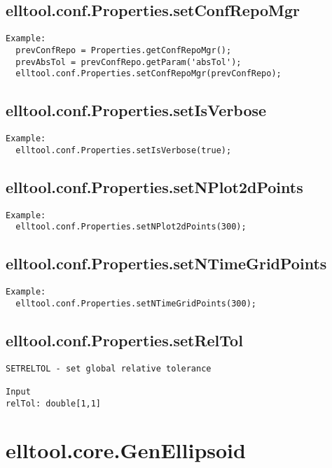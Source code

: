 \subsection{\texorpdfstring{elltool.conf.Properties.setConfRepoMgr}{setConfRepoMgr}}\label{method:elltool.conf.Properties.setConfRepoMgr}
\begin{verbatim}
Example:
  prevConfRepo = Properties.getConfRepoMgr();
  prevAbsTol = prevConfRepo.getParam('absTol');
  elltool.conf.Properties.setConfRepoMgr(prevConfRepo);
\end{verbatim}
\subsection{\texorpdfstring{elltool.conf.Properties.setIsVerbose}{setIsVerbose}}\label{method:elltool.conf.Properties.setIsVerbose}
\begin{verbatim}
Example:
  elltool.conf.Properties.setIsVerbose(true);
\end{verbatim}
\subsection{\texorpdfstring{elltool.conf.Properties.setNPlot2dPoints}{setNPlot2dPoints}}\label{method:elltool.conf.Properties.setNPlot2dPoints}
\begin{verbatim}
Example:
  elltool.conf.Properties.setNPlot2dPoints(300);
\end{verbatim}
\subsection{\texorpdfstring{elltool.conf.Properties.setNTimeGridPoints}{setNTimeGridPoints}}\label{method:elltool.conf.Properties.setNTimeGridPoints}
\begin{verbatim}
Example:
  elltool.conf.Properties.setNTimeGridPoints(300);
\end{verbatim}
\subsection{\texorpdfstring{elltool.conf.Properties.setRelTol}{setRelTol}}\label{method:elltool.conf.Properties.setRelTol}
\begin{verbatim}
SETRELTOL - set global relative tolerance

Input
relTol: double[1,1]
\end{verbatim}
\section{elltool.core.GenEllipsoid}\label{secClassDescr:elltool.core.GenEllipsoid}
